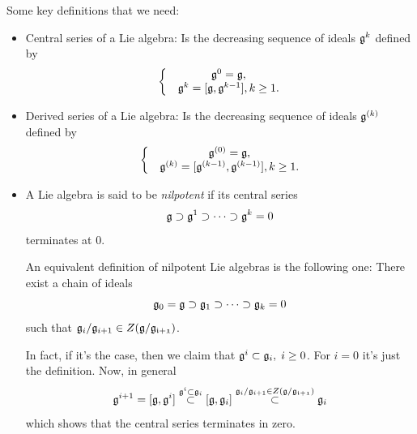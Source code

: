 Some key definitions that we need:
\begin{itemize}
    \item Central series of a Lie algebra: Is the decreasing sequence of ideals $\mathfrak{g}^k$ defined by
    \begin{equation}
        \left\{\begin{matrix}
            &\mathfrak{g}^0=\mathfrak{g},\\
            &\mathfrak{g}^k=[\mathfrak{g},\mathfrak{g}^{k-1}],k\geq1.
        \end{matrix}\right.
    \end{equation}
    \item Derived series of a Lie algebra: Is the decreasing sequence of ideals $\mathfrak{g}^{(k)}$ defined by
    \begin{equation}
        \left\{\begin{matrix}
            &\mathfrak{g}^{(0)}=\mathfrak{g},\\
            &\mathfrak{g}^{(k)}=[\mathfrak{g}^{(k-1)},\mathfrak{g}^{(k-1)}],k\geq1.
        \end{matrix}\right.
    \end{equation}
    \item A Lie algebra is said to be \textit{nilpotent} if its central series
    \begin{equation}
       \mathfrak{g}\supset \mathfrak{g}^1\supset\cdots\supset\mathfrak{g}^k= 0
    \end{equation}
    terminates at 0.

    \begin{dang}
        \begin{remark}
            An equivalent definition of nilpotent Lie algebras is the following one: There exist a chain of ideals 
            \begin{equation}
                 \mathfrak{g}_0=\mathfrak{g}\supset\mathfrak{g}_1\supset\cdots\supset\mathfrak{g}_k=0
            \end{equation}
            such that $\mathfrak{g}_i/\mathfrak{g}_{i+1}\in Z(\mathfrak{g}/\mathfrak{g_{i+1}})$.
        \end{remark}
    \end{dang}
    In fact, if it's the case, then we claim that $\mathfrak{g}^i\subset \mathfrak{g}_i,\;i\geq0$. For $i=0$ it's just the 
    definition. Now, in general 
    \begin{equation}
        \mathfrak{g}^{i+1}=[\mathfrak{g},\mathfrak{g}^{i}]\overset{\mathfrak{g}^{i}\subset\mathfrak{g}_i}{\subset}[\mathfrak{g},\mathfrak{g}_{i}]
        \overset{\mathfrak{g}_i/\mathfrak{g}_{i+1}\in Z(\mathfrak{g}/\mathfrak{g_{i+1}})}{\subset}\mathfrak{g}_i
    \end{equation}
    which shows that the central series terminates in zero.



\end{itemize}
